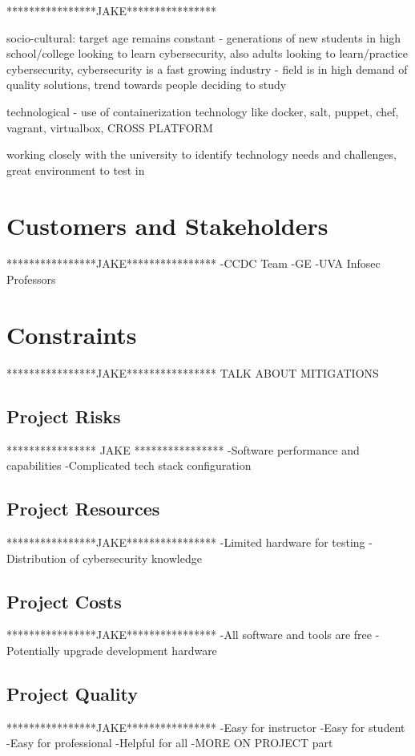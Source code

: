 \documentclass[openright]{report}
\begin{document}
\par 

****************JAKE****************

socio-cultural: target age remains constant - generations of new students in high school/college looking to learn cybersecurity, also adults looking to learn/practice cybersecurity, cybersecurity is a fast growing industry - field is in high demand of quality solutions, trend towards people deciding to study 

technological - use of containerization technology like docker, salt, puppet, chef, vagrant, virtualbox, CROSS PLATFORM

working closely with the university to identify technology needs and challenges, great environment to test in


\section{Customers and Stakeholders}
****************JAKE****************
-CCDC Team
-GE
-UVA Infosec Professors

\section{Constraints}
****************JAKE****************
TALK ABOUT MITIGATIONS

\subsection{Project Risks}
**************** JAKE ****************
-Software performance and capabilities
-Complicated tech stack configuration

\subsection{Project Resources}
****************JAKE****************
-Limited hardware for testing
-Distribution of cybersecurity knowledge

\subsection{Project Costs}
****************JAKE****************
-All software and tools are free
-Potentially upgrade development hardware

\subsection{Project Quality}
****************JAKE****************
-Easy for instructor
-Easy for student
-Easy for professional
-Helpful for all
-MORE ON PROJECT part
\end{document}
